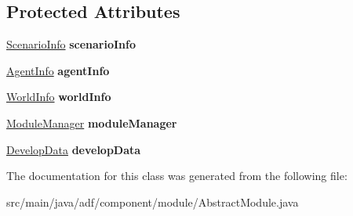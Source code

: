 \subsection*{Protected Attributes}
\begin{DoxyCompactItemize}
\item 
\hypertarget{classadf_1_1component_1_1module_1_1AbstractModule_a4f3c28aad990c2d969f06f0cd7955281}{}\label{classadf_1_1component_1_1module_1_1AbstractModule_a4f3c28aad990c2d969f06f0cd7955281} 
\hyperlink{classadf_1_1agent_1_1info_1_1ScenarioInfo}{Scenario\+Info} {\bfseries scenario\+Info}
\item 
\hypertarget{classadf_1_1component_1_1module_1_1AbstractModule_a7899d34c90df44723cdcb35653735a54}{}\label{classadf_1_1component_1_1module_1_1AbstractModule_a7899d34c90df44723cdcb35653735a54} 
\hyperlink{classadf_1_1agent_1_1info_1_1AgentInfo}{Agent\+Info} {\bfseries agent\+Info}
\item 
\hypertarget{classadf_1_1component_1_1module_1_1AbstractModule_a55634f32bad39f01c25258278fbc37aa}{}\label{classadf_1_1component_1_1module_1_1AbstractModule_a55634f32bad39f01c25258278fbc37aa} 
\hyperlink{classadf_1_1agent_1_1info_1_1WorldInfo}{World\+Info} {\bfseries world\+Info}
\item 
\hypertarget{classadf_1_1component_1_1module_1_1AbstractModule_a4e44edcd327e67f929c357b77b127f89}{}\label{classadf_1_1component_1_1module_1_1AbstractModule_a4e44edcd327e67f929c357b77b127f89} 
\hyperlink{classadf_1_1agent_1_1module_1_1ModuleManager}{Module\+Manager} {\bfseries module\+Manager}
\item 
\hypertarget{classadf_1_1component_1_1module_1_1AbstractModule_aa7337d08e34428dfc5baa9582c3d4444}{}\label{classadf_1_1component_1_1module_1_1AbstractModule_aa7337d08e34428dfc5baa9582c3d4444} 
\hyperlink{classadf_1_1agent_1_1develop_1_1DevelopData}{Develop\+Data} {\bfseries develop\+Data}
\end{DoxyCompactItemize}


The documentation for this class was generated from the following file\+:\begin{DoxyCompactItemize}
\item 
src/main/java/adf/component/module/Abstract\+Module.\+java\end{DoxyCompactItemize}
